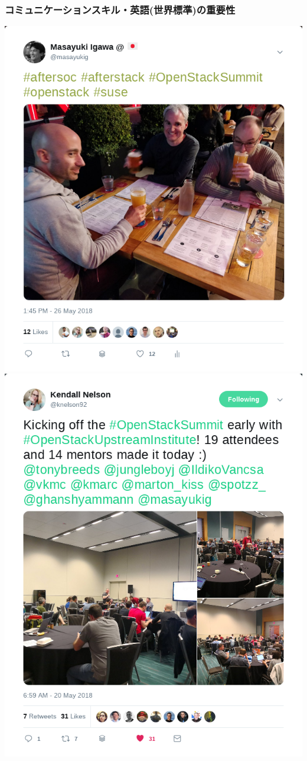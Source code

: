\documentclass[aspectratio=169,11pt,hyperref={colorlinks=true}]{beamer}
\begin{document}
\begin{frame}
  \frametitle{コミュニケーションスキル・英語(世界標準)の重要性}
  \centering\includegraphics[scale=0.28]{images/tweet-suse.png}
  \centering\includegraphics[scale=0.28]{images/tweet-oui.png}
\end{frame}
\end{document}
